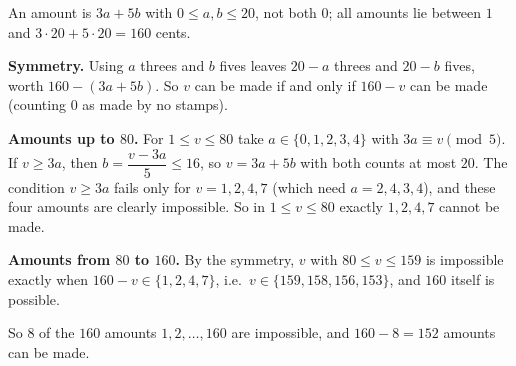 An amount is $3a+5b$ with $0\le a,b\le20$, not both $0$; all amounts lie between $1$ and $3\cdot20+5\cdot20=160$ cents.

\textbf{Symmetry.} Using $a$ threes and $b$ fives leaves $20-a$ threes and $20-b$ fives, worth $160-(3a+5b)$. So $v$ can be made if and only if $160-v$ can be made (counting $0$ as made by no stamps).

\textbf{Amounts up to $80$.} For $1\le v\le80$ take $a\in\{0,1,2,3,4\}$ with $3a\equiv v\pmod5$. If $v\ge3a$, then $b=\dfrac{v-3a}{5}\le16$, so $v=3a+5b$ with both counts at most $20$. The condition $v\ge3a$ fails only for $v=1,2,4,7$ (which need $a=2,4,3,4$), and these four amounts are clearly impossible. So in $1\le v\le80$ exactly $1,2,4,7$ cannot be made.

\textbf{Amounts from $80$ to $160$.} By the symmetry, $v$ with $80\le v\le159$ is impossible exactly when $160-v\in\{1,2,4,7\}$, i.e.\ $v\in\{159,158,156,153\}$, and $160$ itself is possible.

So $8$ of the $160$ amounts $1,2,\dots,160$ are impossible, and $160-8=\boxed{152}$ amounts can be made.
